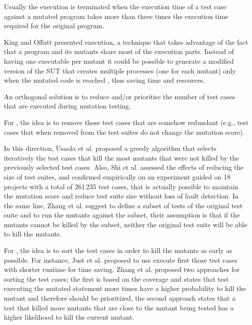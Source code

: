 Usually \cite{papadakis2019mutation} the execution is terminated when the execution time of a test case against a mutated program takes more than three times the execution time required for the original program.

King and Offutt \cite{king1991fortran} presented  execution, a technique that takes advantage of the fact that a program and its mutants share most of the execution parts. Instead of having one executable per mutant it could be possible to generate a modified version of the SUT that creates multiple processes (one for each mutant) only when the mutated code is reached \cite{tokumoto2016muvm}, thus saving time and resources. 

An orthogonal solution is to reduce and/or prioritise the number of test cases that are executed during mutation testing.

For , the idea is to remove those test cases that are somehow redundant (e.g., test cases that when removed from the test suites do not change the mutation score).

In this direction, Usaola et al. \cite{usaola2012reduction} proposed a greedy algorithm that selects iteratively the test cases that kill the most mutants that were not killed by the previously selected test cases. 
Also, Shi et al. \cite{shi2014balancing} assessed the effects of reducing the size of test suites, and confirmed empirically on an experiment guided on 18 projects with a total of 261\,235 test cases, that is actually possible to maintain the mutation score and reduce test suite size without loss of fault detection. 
In the same line, Zhang et al. \cite{zhang2013faster} suggest to define a subset of tests of the original test suite and to run the mutants against the subset, their assumption is that if the mutants cannot be killed by the subset, neither the original test suite will be able to kill the mutants.

For , the idea is to sort the test cases in order to kill the mutants as early as possible. For instance, Just et al. \cite{just2012using} proposed to use execute first those test cases with shorter runtime for time saving.
Zhang et al. \cite{zhang2013faster} proposed two approaches for sorting the test cases; the first is based on the coverage and states that test executing the mutated statement more times have a higher probability to kill the mutant and therefore should be prioritized, the second approach states that a test that killed more mutants that are close to the mutant being tested has a higher likelihood to kill the current mutant. 

